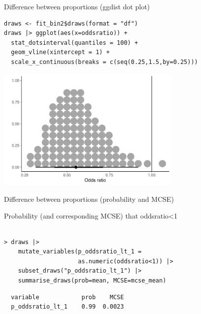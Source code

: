 \documentclass[finnish,english,t]{beamer}
\begin{document}
\begin{frame}[fragile]{Difference between proportions (ggdist dot plot)}
  
  \vspace{-0.5\baselineskip}
  {\small
\begin{verbatim}
draws <- fit_bin2$draws(format = "df")
draws |> ggplot(aes(x=oddsratio)) +
  stat_dotsinterval(quantiles = 100) + 
  geom_vline(xintercept = 1) +
  scale_x_continuous(breaks = c(seq(0.25,1.5,by=0.25)))
\end{verbatim}
  }

  \begin{center}
  \includegraphics[width=9cm]{betablockoddsratio_dots100.pdf}
\end{center}
\end{frame}

\begin{frame}[fragile]{Difference between proportions (probability and MCSE)}

  Probability (and corresponding MCSE) that oddsratio<1
  \\~
  
{\small
\begin{verbatim}
> draws |>
    mutate_variables(p_oddsratio_lt_1 =
                     as.numeric(oddsratio<1)) |>
    subset_draws("p_oddsratio_lt_1") |>
    summarise_draws(prob=mean, MCSE=mcse_mean)
\end{verbatim}
\begin{verbatim}
  variable            prob    MCSE
  p_oddsratio_lt_1    0.99  0.0023
\end{verbatim}
  }

\end{frame}
\end{document}
